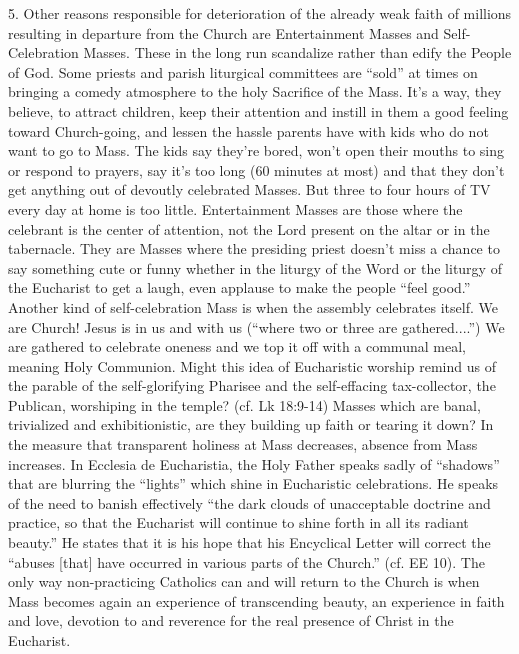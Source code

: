 \documentclass[oneside]{book}
\begin{document}
5. Other reasons responsible for deterioration of the already weak faith of
millions resulting in departure from the Church are Entertainment Masses and
Self-Celebration Masses. These in the long run scandalize rather than edify the
People of God. Some priests and parish liturgical committees are ``sold'' at
times on bringing a comedy atmosphere to the holy Sacrifice of the Mass. It's a
way, they believe, to attract children, keep their attention and instill in them
a good feeling toward Church-going, and lessen the hassle parents have with kids
who do not want to go to Mass. The kids say they're bored, won't open their
mouths to sing or respond to prayers, say it's too long (60 minutes at most) and
that they don't get anything out of devoutly celebrated Masses. But three to
four hours of TV every day at home is too little. Entertainment Masses are those
where the celebrant is the center of attention, not the Lord present on the
altar or in the tabernacle. They are Masses where the presiding priest doesn't
miss a chance to say something cute or funny whether in the liturgy of the Word
or the liturgy of the Eucharist to get a laugh, even applause to make the people
``feel good.''
Another kind of self-celebration Mass is when the assembly celebrates itself. We
are Church! Jesus is in us and with us (``where two or three are gathered....'')
We are gathered to celebrate oneness and we top it off with a communal meal,
meaning Holy Communion. Might this idea of Eucharistic worship remind us of the
parable of the self-glorifying Pharisee and the self-effacing tax-collector, the
Publican, worshiping in the temple? (cf. Lk 18:9-14) Masses which are banal,
trivialized and exhibitionistic, are they building up faith or tearing it down?
In the measure that transparent holiness at Mass decreases, absence from Mass
increases.
In Ecclesia de Eucharistia, the Holy Father speaks sadly of ``shadows'' that are
blurring the ``lights'' which shine in Eucharistic celebrations. He speaks of
the need to banish effectively ``the dark clouds of unacceptable doctrine and
practice, so that the Eucharist will continue to shine forth in all its radiant
beauty.'' He states that it is his hope that his Encyclical Letter will
correct the ``abuses [that] have occurred in various parts of the Church.''
(cf. EE 10). The only way non-practicing Catholics can and will return to the
Church is when Mass becomes again an experience of transcending beauty, an
experience in faith and love, devotion to and reverence for the real presence of
Christ in the Eucharist.
\end{document}
